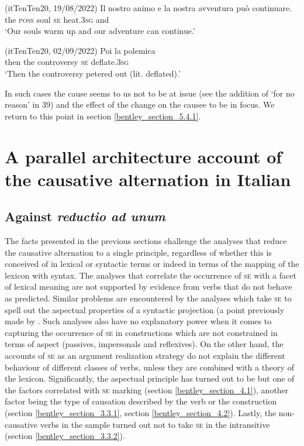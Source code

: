 \documentclass[output=paper,colorlinks,citecolor=brown
]{langscibook}
\begin{document}
\hspace*{\fill}(itTenTen20, 19/08/2022)\quad
\ea \label{bentley_example_41}
    \gll Il		nostro	animo			 e  {la nostra avventura può continuare. } \\
    	the	\textsc{poss}			soul		\textsc{se}		heat.3\textsc{sg}	and			{} \\
    \glt 					‘Our souls warm up and our adventure can continue.’
\z

\hspace*{\fill}(itTenTen20, 02/09/2022)\quad
\ea \label{bentley_example_42}
    \gll Poi 	la		polemica						 \\
    			then	the	controversy	\textsc{se}		deflate.3\textsc{sg}	 \\
    \glt ‘Then the controversy petered out (lit. deflated).’
\z


In such cases the cause seems to us not to be at issue (see the addition of ‘for no reason’ in 39) and the effect of the change on the causee to be in focus. We return to this point in section \ref{bentley_section_5.4.1}.

\section{A parallel architecture account of the causative alternation in Italian}
\label{bentley_section_5}

\subsection{Against \textit{reductio ad unum}}
\label{bentley_section_5.1}

The facts presented in the previous sections challenge the analyses that reduce the causative alternation to a single principle, regardless of whether this is conceived of in lexical or syntactic terms or indeed in terms of the mapping of the lexicon with syntax. The analyses that correlate the occurrence of \textsc{se} with a facet of lexical meaning are not supported by evidence from verbs that do not behave as predicted. Similar problems are encountered by the analyses which take \textsc{se} to spell out the aspectual properties of a syntactic projection (a point previously made by \cite[82—88]{alexiadou2015external}. Such analyses also have no explanatory power when it comes to capturing the occurrence of \textsc{se} in constructions which are not constrained in terms of aspect (passives, impersonals and reflexives). On the other hand, the accounts of \textsc{se} as an argument realization strategy do not explain the different behaviour of different classes of verbs, unless they are combined with a theory of the lexicon. Significantly, the aspectual principle has turned out to be but one of the factors correlated with \textsc{se} marking (section \ref{bentley_section_4.1}), another factor being the type of causation described by the verb or the construction (section \ref{bentley_section_3.3.1}, section \ref{bentley_section_4.2}). Lastly, the non-causative verbs in the sample turned out not to take \textsc{se} in the intransitive (section \ref{bentley_section_3.3.2}). 
\end{document}
